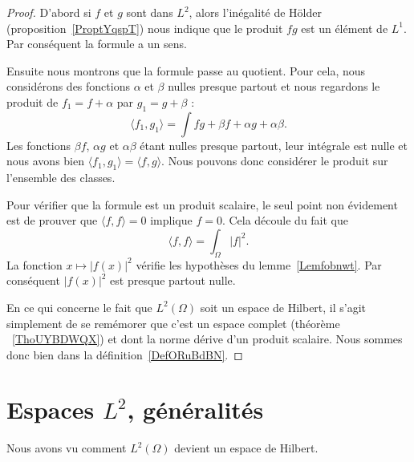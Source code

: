 \begin{proof}
    D'abord si \( f\) et \( g\) sont dans \( L^2\), alors l'inégalité de Hölder (proposition~\ref{ProptYqspT}) nous indique que le produit \( fg\) est un élément de \( L^1\). Par conséquent la formule a un sens.

    Ensuite nous montrons que la formule passe au quotient. Pour cela, nous considérons des fonctions \( \alpha\) et \( \beta\) nulles presque partout et nous regardons le produit de \( f_1=f+\alpha\) par \( g_1=g+\beta\) :
    \begin{equation}
        \langle f_1, g_1\rangle =\int fg+\beta f+\alpha g+ \alpha\beta.
    \end{equation}
    Les fonctions \( \beta f\), \( \alpha g\) et \( \alpha\beta\) étant nulles presque partout, leur intégrale est nulle et nous avons bien \( \langle f_1, g_1\rangle =\langle f,g \rangle \). Nous pouvons donc considérer le produit sur l'ensemble des classes.

    Pour vérifier que la formule est un produit scalaire, le seul point non évidement est de prouver que \( \langle f, f\rangle =0\) implique \( f=0\). Cela découle du fait que
    \begin{equation}
        \langle f, f\rangle =\int_{\Omega}| f |^2.
    \end{equation}
    La fonction \( x\mapsto | f(x) |^2\) vérifie les hypothèses du lemme~\ref{Lemfobnwt}. Par conséquent \( | f(x) |^2\) est presque partout nulle.

    En ce qui concerne le fait que \( L^2(\Omega)\) soit un espace de Hilbert, il s'agit simplement de se remémorer que c'est un espace complet (théorème ~\ref{ThoUYBDWQX}) et dont la norme dérive d'un produit scalaire. Nous sommes donc bien dans la définition~\ref{DefORuBdBN}.
\end{proof}

\section{Espaces \texorpdfstring{$L^2$}{$L^2$}, généralités}
\label{SECooEVZSooLtLhUm}

Nous avons vu comment \( L^2(\Omega)\) devient un espace de Hilbert.


